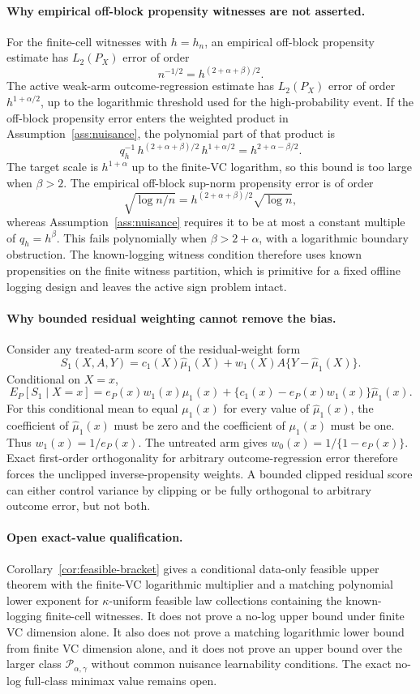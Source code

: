 \documentclass[11pt]{article}
\theoremstyle{definition}
\theoremstyle{plain}
\theoremstyle{remark}
\begin{document}
\paragraph{Why empirical off-block propensity witnesses are not asserted.}
For the finite-cell witnesses with \(h=h_n\), an empirical off-block
propensity estimate has \(L_2(P_X)\) error of order
\[
n^{-1/2}=h^{(2+\alpha+\beta)/2}.
\]
The active weak-arm outcome-regression estimate has \(L_2(P_X)\) error of
order \(h^{1+\alpha/2}\), up to the logarithmic threshold used for the
high-probability event.  If the off-block propensity error enters the
weighted product in Assumption~\ref{ass:nuisance}, the polynomial part of
that product is
\[
q_h^{-1}\,h^{(2+\alpha+\beta)/2}\,h^{1+\alpha/2}
=
h^{2+\alpha-\beta/2}.
\]
The target scale is \(h^{1+\alpha}\) up to the finite-VC logarithm, so this
bound is too large when \(\beta>2\).  The empirical off-block sup-norm
propensity error is of order
\[
\sqrt{\log n/n}
=
h^{(2+\alpha+\beta)/2}\sqrt{\log n},
\]
whereas Assumption~\ref{ass:nuisance} requires it to be at most a constant
multiple of \(q_h=h^\beta\).  This fails polynomially when
\(\beta>2+\alpha\), with a logarithmic boundary obstruction.  The
known-logging witness condition therefore uses known propensities on the
finite witness partition, which is primitive for a fixed offline logging
design and leaves the active sign problem intact.

\paragraph{Why bounded residual weighting cannot remove the bias.}
Consider any treated-arm score of the residual-weight form
\[
S_1(X,A,Y)=c_1(X)\widehat\mu_1(X)+w_1(X)A\{Y-\widehat\mu_1(X)\}.
\]
Conditional on \(X=x\),
\[
E_P[S_1\mid X=x]
=e_P(x)w_1(x)\mu_1(x)
+\{c_1(x)-e_P(x)w_1(x)\}\widehat\mu_1(x).
\]
For this conditional mean to equal \(\mu_1(x)\) for every value of
\(\widehat\mu_1(x)\), the coefficient of \(\widehat\mu_1(x)\) must be zero
and the coefficient of \(\mu_1(x)\) must be one.  Thus
\(w_1(x)=1/e_P(x)\).  The untreated arm gives
\(w_0(x)=1/\{1-e_P(x)\}\).  Exact first-order orthogonality for arbitrary
outcome-regression error therefore forces the unclipped inverse-propensity
weights.  A bounded clipped residual score can either control variance by
clipping or be fully orthogonal to arbitrary outcome error, but not both.

\paragraph{Open exact-value qualification.}
Corollary~\ref{cor:feasible-bracket} gives a conditional data-only feasible
upper theorem with the finite-VC logarithmic multiplier and a matching
polynomial lower exponent for \(\kappa\)-uniform feasible law collections
containing the known-logging finite-cell witnesses.  It does not prove a
no-log upper bound under finite VC dimension alone.  It also does not prove
a matching logarithmic lower bound from finite VC dimension alone, and it
does not prove an upper bound over the larger class
\(\mathcal P_{\alpha,\gamma}\) without common nuisance learnability
conditions.  The exact no-log full-class minimax value remains open.
\end{document}
